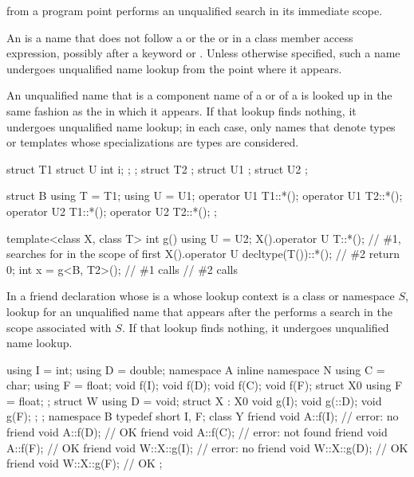 \pnum
{}
from a program point performs an unqualified search in its immediate scope.

\pnum
An  is a name
that does not follow a  or
the  or \tcode{->} in a class member access expression,
possibly after a  keyword or \tcode{\~}.
Unless otherwise specified,
such a name undergoes unqualified name lookup from the point where it appears.

\pnum
An unqualified name that is a component name of
a  or  of
a  is looked up in the same fashion
as the  in which it appears.
If that lookup finds nothing, it undergoes unqualified name lookup;
in each case, only names
that denote types or templates whose specializations are types are considered.
\begin{example}
\begin{codeblock}
struct T1 { struct U { int i; }; };
struct T2 { };
struct U1 {};
struct U2 {};

struct B {
  using T = T1;
  using U = U1;
  operator U1 T1::*();
  operator U1 T2::*();
  operator U2 T1::*();
  operator U2 T2::*();
};

template<class X, class T>
int g() {
  using U = U2;
  X().operator U T::*();                // \#1, searches for  in the scope of  first
  X().operator U decltype(T())::*();    // \#2
  return 0;
}
int x = g<B, T2>();                     // \#1 calls 
                                        // \#2 calls 
\end{codeblock}
\end{example}

\pnum
In a friend declaration 
whose  is a 
whose lookup context is a class or namespace $S$,
lookup for an unqualified name
that appears after the 
performs a search in the scope associated with $S$.
If that lookup finds nothing, it undergoes unqualified name lookup.
\begin{example}
\begin{codeblock}
using I = int;
using D = double;
namespace A {
  inline namespace N {using C = char; }
  using F = float;
  void f(I);
  void f(D);
  void f(C);
  void f(F);
}
struct X0 {using F = float; };
struct W {
  using D = void;
  struct X : X0 {
    void g(I);
    void g(::D);
    void g(F);
  };
};
namespace B {
  typedef short I, F;
  class Y {
    friend void A::f(I);        // error: no 
    friend void A::f(D);        // OK
    friend void A::f(C);        // error:  not found
    friend void A::f(F);        // OK
    friend void W::X::g(I);     // error: no 
    friend void W::X::g(D);     // OK
    friend void W::X::g(F);     // OK
  };
}
\end{codeblock}
\end{example}

